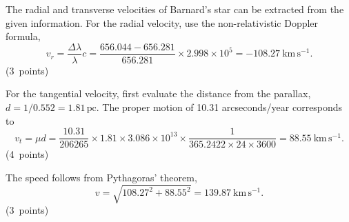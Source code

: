 The radial and transverse velocities of Barnard's star can be extracted from the given information.
For the radial velocity, use the non-relativistic Doppler formula,
\[
v_r=\frac{\Delta\lambda}{\lambda}c
=\frac{656.044-656.281}{656.281}\times2.998\times10^5
=-108.27\ \mathrm{km\,s^{-1}}.
\]
\hfill\mbox{(3 points)}

For the tangential velocity, first evaluate the distance from the parallax, $d=1/0.552=1.81\,\mathrm{pc}$.
The proper motion of 10.31 arcseconds/year corresponds to
\[
v_t=\mu d=\frac{10.31}{206265}\times1.81\times3.086\times10^{13}
\times\frac{1}{365.2422\times24\times3600}
=88.55\ \mathrm{km\,s^{-1}}.
\]
\hfill\mbox{(4 points)}

The speed follows from Pythagoras' theorem,
\[
v=\sqrt{108.27^2+88.55^2}=139.87\ \mathrm{km\,s^{-1}}.
\]
\hfill\mbox{(3 points)}
